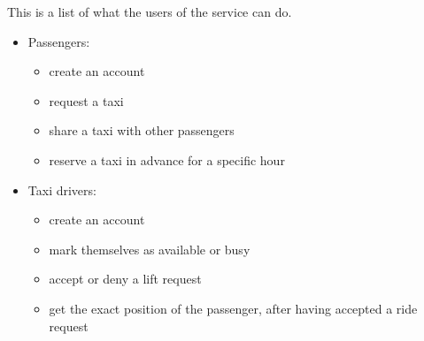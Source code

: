 This is a list of what the users of the service can do.
\begin{itemize}
\item Passengers:
    \begin{itemize}
    	\item create an account
    	\item request a taxi
    	\item share a taxi with other passengers
	\item reserve a taxi in advance for a specific hour
    \end{itemize}
\item Taxi drivers:
    \begin{itemize}
    	\item create an account
    	\item mark themselves as available or busy
    	\item accept or deny a lift request
	\item get the exact position of the passenger, after having accepted a ride request
    \end{itemize}
\end{itemize}
